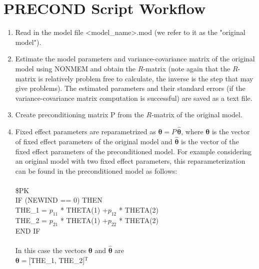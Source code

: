 \section{PRECOND Script Workflow}
\begin{enumerate}
    \item Read in the model file <model\_name>.mod (we refer to it as the "original model").
    \item Estimate the model parameters and variance-covariance matrix of the original model using NONMEM and obtain the $R$-matrix (note again that the $R$-matrix is relatively problem free to calculate, the inverse is the step that may give problems).  The estimated parameters and their standard errors (if the variance-covariance matrix computation is successful) are saved as a text file.
    \item Create preconditioning matrix P from the $R$-matrix of the original model.
    \item Fixed effect parameters are reparametrized as $\boldsymbol{\theta} = P \,\hat{\boldsymbol{\theta}}$, where $\boldsymbol{\theta}$ is the vector of fixed effect parameters of the original model and $\hat{\boldsymbol{\theta}}$ is the vector of the fixed effect parameters of the preconditioned model.
     For example considering an original model with two fixed effect parameters, this reparameterization can be found in the preconditioned model as follows:\\
\\
        \$PK\\
        IF (NEWIND == 0) THEN\\
        THE\_1 = $p_{11}$ * THETA(1) +$p_{12}$ * THETA(2)\\
        THE\_2 = $p_{21}$ * THETA(1) +$p_{22}$ * THETA(2)\\
        END IF\\
        \\
              In this case the vectors  ${\boldsymbol{\theta}}$ and $\hat{\boldsymbol{\theta}}$ are\\
        \indent $\boldsymbol{\theta}=$[THE\_1, THE\_2]$^\textrm{T}$\\

\end{enumerate}
